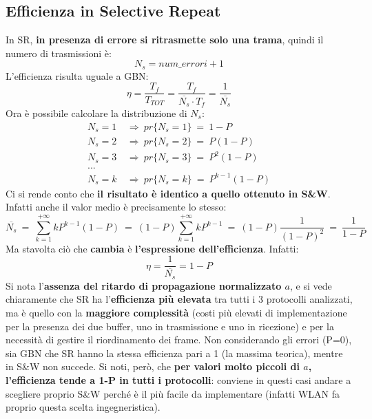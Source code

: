 \documentclass[12pt]{article}
\begin{document}
\subsection{Efficienza in Selective Repeat}

In SR, \textbf{in presenza di errore si ritrasmette solo una trama}, quindi il numero di trasmissioni è:
\begin{equation*}
    N_s = num\_errori + 1
\end{equation*}
L'efficienza risulta uguale a GBN:
\begin{equation*}
    \eta = \frac{T_f}{T_{TOT}} = \frac{T_f}{\overline{N_s} \cdot T_f} = \frac{1}{\overline{N_s}}
\end{equation*}
Ora è possibile calcolare la distribuzione di $N_s$:
\begin{align*}
    N_s = 1\ &\Rightarrow\ pr\{N_s = 1\}\ =\ 1 - P\\
    N_s = 2\ &\Rightarrow\ pr\{N_s = 2\}\ =\ P(1 - P)\\
    N_s = 3\ &\Rightarrow\ pr\{N_s = 3\}\ =\ P^2(1 - P)\\
    ...\\
    N_s = k\ &\Rightarrow\ pr\{N_s = k\}\ =\ P^{k-1}(1 - P)
\end{align*}
Ci si rende conto che \textbf{il risultato è identico a quello ottenuto in S\&W}. Infatti anche il valor medio è precisamente lo stesso:
\begin{equation*}
    \overline{N_s}\ =\ \sum^{+\infty}_{k=1}kP^{k-1}(1-P)\ =\ (1-P)\sum^{+\infty}_{k=1}kP^{k-1} \ =\ (1-P)\frac{1}{(1-P)^2}\ =\ \frac{1}{1-P}
\end{equation*}
Ma stavolta ciò che \textbf{cambia} è \textbf{l'espressione dell'efficienza}. Infatti:
\begin{equation*}
    \eta = \frac{1}{\overline{N_s}} = 1-P
\end{equation*}
Si nota l'\textbf{assenza del ritardo di propagazione normalizzato $a$}, e si vede chiaramente che SR ha l'\textbf{efficienza più elevata} tra tutti i 3 protocolli analizzati, ma è quello con la \textbf{maggiore complessità} (costi più elevati di implementazione per la presenza dei due buffer, uno in trasmissione e uno in ricezione) e per la necessità di gestire il riordinamento dei frame. Non considerando gli errori (P=0), sia GBN che SR hanno la stessa efficienza pari a 1 (la massima teorica), mentre in S\&W non succede. Si noti, però, che \textbf{per valori molto piccoli di $a$, l'efficienza tende a 1-P in tutti i protocolli}: conviene in questi casi andare a scegliere proprio S\&W perché è il più facile da implementare (infatti WLAN fa proprio questa scelta ingegneristica).
\end{document}
